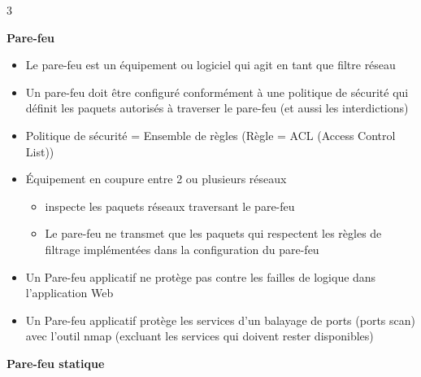 \documentclass[9pt, a4paper, twoside]{article}
\begin{document}
\begin{multicols}{3}
\begin{flushleft}
    \scriptsize \textbf{Pare-feu}
\end{flushleft}

\begin{itemize}[label=$\bullet$]
    \item \scriptsize Le pare-feu est un équipement ou logiciel qui agit en tant que filtre réseau
    \item \scriptsize Un pare-feu doit être configuré conformément à une politique de sécurité qui définit les paquets autorisés à traverser le pare-feu (et aussi les interdictions) 
    \item \scriptsize Politique de sécurité = Ensemble de règles (Règle = ACL (Access Control List))
    \item \scriptsize Équipement en coupure entre 2 ou plusieurs réseaux
    \begin{itemize}[label=$\circ$]
        \item \scriptsize inspecte les paquets réseaux traversant le pare-feu
        \item \scriptsize Le pare-feu ne transmet que les paquets qui respectent les règles de filtrage implémentées dans la configuration du pare-feu
    \end{itemize}
    \item \scriptsize Un Pare-feu applicatif ne protège pas contre les failles de logique dans l'application Web
    \item \scriptsize Un Pare-feu applicatif protège les services d'un balayage de ports (ports scan) avec l'outil nmap (excluant les services qui doivent rester disponibles)
\end{itemize}

\begin{flushleft}
    \scriptsize \textbf{Pare-feu statique}
\end{flushleft}


\end{multicols}
\end{document}

